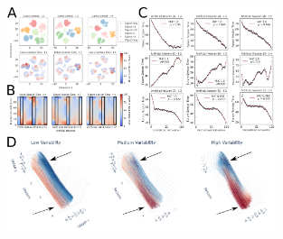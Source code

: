 \begin{figure}[ht]
\centering
\includegraphics[width=0.7\textwidth]{images/chapter_4/dynamic_repr_42.png}

\end{figure}

